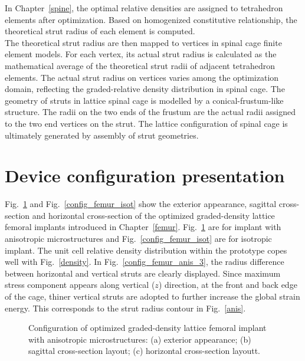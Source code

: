 \documentclass[12pt]{extbook}
\begin{document}
In Chapter~\ref{spine}, the optimal relative densities are assigned to tetrahedron elements after optimization. Based on homogenized constitutive relationship, the theoretical strut radius of each element is computed.\\

The theoretical strut radius are then mapped to vertices in spinal cage finite element models. For each vertex, its actual strut radius is calculated as the mathematical average of the theoretical strut radii of adjacent tetrahedron elements. The actual strut radius on vertices varies among the optimization domain, reflecting the graded-relative density distribution in spinal cage. The geometry of struts in lattice spinal cage is modelled by a conical-frustum-like structure. The radii on the two ends of the frustum are the actual radii assigned to the two end vertices on the strut. The lattice configuration of spinal cage is ultimately generated by assembly of strut geometries.\\


\section{Device configuration presentation}
\label{recon_pres}

Fig.~\ref{config_femur_anis} and Fig.~\ref{config_femur_isot} show the exterior appearance, sagittal cross-section and horizontal cross-section of the optimized graded-density lattice femoral implants introduced in Chapter~\ref{femur}. Fig.~\ref{config_femur_anis} are for implant with anisotropic microstructures and Fig.~\ref{config_femur_isot} are for isotropic implant. The unit cell relative density distribution within the prototype copes well with Fig.~\ref{density}. In Fig.~\ref{config_femur_anis_3}, the radius difference between horizontal and vertical struts are clearly displayed. Since maximum stress component appears along vertical ($z$) direction, at the front and back edge of the cage, thiner vertical struts are adopted to further increase the global strain energy. This corresponds to the strut radius contour in Fig.~\ref{anis}.\\

\begin{figure}[htbp]
\centering
{}
\caption{Configuration of optimized graded-density lattice femoral implant with anisotropic microstructures: (a) exterior appearance; (b) sagittal cross-section layout; (c) horizontal cross-section layoutt.}
\label{config_femur_anis}
\end{figure}
\end{document}
